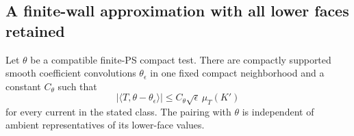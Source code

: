 \subsection{A finite-wall approximation with all lower faces retained}

\begin{lemma}
\label{lem:r13-uniform-compatible-ps-approximation}
Let $\theta$ be a compatible finite-PS compact test.  There
are compactly supported smooth coefficient convolutions
$\theta_\epsilon$ in one fixed compact neighborhood and a
constant $C_\theta$ such that
\[
       |\langle T,\theta-\theta_\epsilon\rangle|
                 \le C_\theta\sqrt\epsilon\,\mu_T(K')
 \tag{PT7}
\]
for every current in the stated class.  The pairing with
$\theta$ is independent of ambient representatives of its
lower-face values.
\end{lemma}

